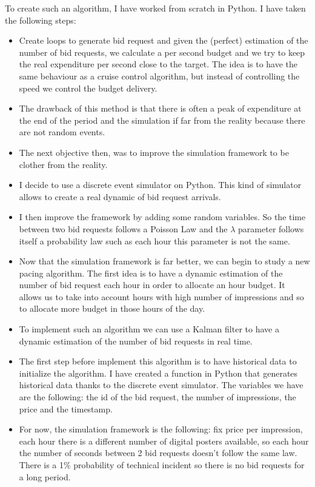 \documentclass[12pt]{article}
\begin{document}
To create such an algorithm, I have worked from scratch in Python. I have taken the following steps:
\begin{itemize}
\item Create loops to generate bid request and given the (perfect) estimation of the number of bid requests, we calculate a per second budget and we try to keep the real expenditure per second close to the target. The idea is to have the same behaviour as a cruise control algorithm, but instead of controlling the speed we control the budget delivery.
\item The drawback of this method is that there is often a peak of expenditure at the end of the period and the simulation if far from the reality because there are not random events. 
\item The next objective then, was to improve the simulation framework to be clother from the reality.
\item I decide to use a discrete event simulator on Python. This kind of simulator allows to create a real dynamic of bid request arrivals.
\item I then improve the framework by adding some random variables. So the time between two bid requests follows a Poisson Law and the $\lambda$ parameter follows itself a probability law such as each hour this parameter is not the same. 
\item Now that the simulation framework is far better, we can begin to study a new pacing algorithm. The first idea is to have a dynamic estimation of the number of bid request each hour in order to allocate an hour budget. It allows us to take into account hours with high number of impressions and so to allocate more budget in those hours of the day. 
\item To implement such an algorithm we can use a Kalman filter to have a dynamic estimation of the number of bid requests in real time. 	
\item The first step before implement this algorithm is to have historical data to initialize the algorithm. I have created a function in Python that generates historical data thanks to the discrete event simulator. The variables we have are the following: the id of the bid request, the number of impressions, the price and the timestamp.
\item For now, the simulation framework is the following: fix price per impression, each hour there is a different number of digital posters available, so each hour the number of seconds between 2 bid requests doesn't follow the same law. There is a 1\% probability of technical incident so there is no bid requests for a long period. 
\end{itemize}
\end{document}
